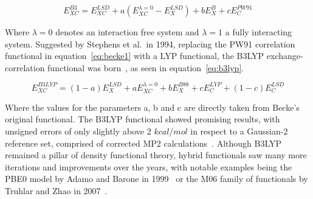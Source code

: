 \documentclass[11pt]{article}
\begin{document}
\begin{equation}
  E_{XC}^{B3} = E_{XC}^{LSD}+a(E_{XC}^{\lambda = 0}-E_{X}^{LSD})+bE_{X}^{B}+cE_{C}^{PW91}
  \label{eq:becke1}
\end{equation}

\bigskip

\noindent Where $\lambda=0$ denotes an interaction free system and $\lambda=1$ a fully interacting system.
Suggested by Stephens et al.~in 1994, replacing the PW91 correlation functional in equation~\ref{eq:becke1} with a LYP functional, the B3LYP exchange-correlation functional was born~\cite{stephens_ab_1994}, as seen in equation~\ref{eq:b3lyp}.

\begin{equation}
  E_{XC}^{B3LYP} = (1-a) E_{X}^{LSD}+aE_{XC}^{\lambda = 0}+bE_{X}^{B88}+cE_{C}^{LYP}+(1-c)E_C^{LSD}
  \label{eq:b3lyp}
\end{equation}

\bigskip

\noindent Where the values for the parameters a, b and c are directly taken from Becke's original functional.
The B3LYP functional showed promising results, with unsigned errors of only slightly above 2 $kcal/mol$ in respect to a Gaussian-2 reference set, comprised of corrected MP2 calculations~\cite{Curtiss1991}.
Although B3LYP remained a pillar of density functional theory, hybrid functionals saw many more iterations and improvements over the years, with notable examples being the PBE0 model by Adamo and Barone in 1999~\cite{Adamo1999} or the M06 family of functionals by Truhlar and Zhao in 2007~\cite{Zhao2007}.
\end{document}
